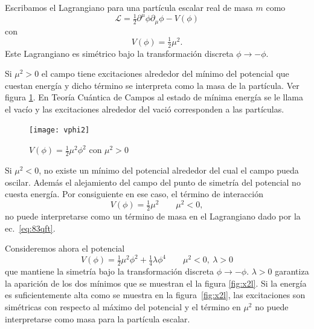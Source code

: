 \begin{frame}
Escribamos el Lagrangiano para una partícula escalar real de masa $m$ como
\begin{equation}
\label{eq:83qft}
\mathcal{L}=\tfrac{1}{2}\partial^\mu\phi\partial_\mu\phi-V(\phi)
\end{equation}
con
\begin{equation}
  V(\phi)=\tfrac{1}{2}\mu^2.
\end{equation}
Este Lagrangiano es simétrico bajo la transformación discreta $\phi\to-\phi$. 

Si $\mu^2\gt 0$ el campo tiene excitaciones alrededor del mínimo del potencial que cuestan energía y dicho término se interpreta como la masa de la partícula. Ver figura \ref{fig:x2}. En Teoría Cuántica de Campos al estado de mínima energía se le llama el vacío y las excitaciones alrededor del vació corresponden a las partículas.
\begin{figure} %
  \centering %
  \texttt{[image: vphi2]}
  \caption{$V(\phi)=\frac{1}{2}\mu^2 \phi^2$ con $\mu^2\gt 0$} %
  \label{fig:x2} %
\end{figure} %

Si $\mu^2\lt 0$, no existe un mínimo del potencial alrededor del cual el campo pueda oscilar. Además el alejamiento del campo del punto de simetría del potencial no cuesta energía. Por consiguiente en ese caso, el término de interacción
\begin{equation}
  V(\phi)=\tfrac{1}{2}\mu^2   \qquad 
  \mu^2\lt 0,
\end{equation}
no puede interpretarse como un término de masa en el Lagrangiano dado por la ec.~\eqref{eq:83qft}. 

Consideremos ahora el potencial
\begin{equation}
  V(\phi)=\tfrac{1}{2}\mu^2\phi^2+\tfrac{1}{4}\lambda\phi^4
  \qquad   \mu^2\lt 0,\ \lambda\gt 0
\end{equation}
que mantiene la simetría bajo la transformación discreta $\phi\to-\phi$. $\lambda\gt 0$ garantiza la aparición de los dos mínimos que se muestran el la figura \ref{fig:x2l}. Si la energía es suficientemente alta como se muestra en la figura~\ref{fig:x2l}, las excitaciones son simétricas con respecto al máximo del potencial y el término en $\mu^2$ no puede interpretarse como masa para la partícula escalar. 


\end{frame}
